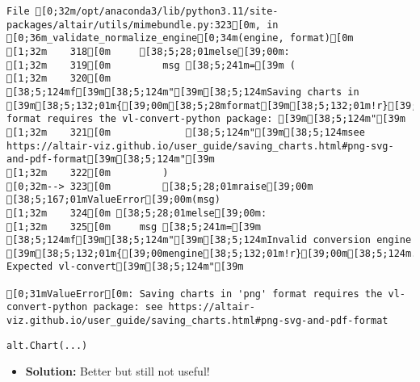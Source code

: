 \documentclass[
  letterpaper,
  DIV=11,
  numbers=noendperiod]{scrartcl}
\providecommand{\tightlist}{%
  \setlength{\itemsep}{0pt}\setlength{\parskip}{0pt}}\usepackage{longtable,booktabs,array}
\begin{document}
\begin{verbatim}
File [0;32m/opt/anaconda3/lib/python3.11/site-packages/altair/utils/mimebundle.py:323[0m, in [0;36m_validate_normalize_engine[0;34m(engine, format)[0m
[1;32m    318[0m     [38;5;28;01melse[39;00m:
[1;32m    319[0m         msg [38;5;241m=[39m (
[1;32m    320[0m             [38;5;124mf[39m[38;5;124m"[39m[38;5;124mSaving charts in [39m[38;5;132;01m{[39;00m[38;5;28mformat[39m[38;5;132;01m!r}[39;00m[38;5;124m format requires the vl-convert-python package: [39m[38;5;124m"[39m
[1;32m    321[0m             [38;5;124m"[39m[38;5;124msee https://altair-viz.github.io/user_guide/saving_charts.html#png-svg-and-pdf-format[39m[38;5;124m"[39m
[1;32m    322[0m         )
[0;32m--> 323[0m         [38;5;28;01mraise[39;00m [38;5;167;01mValueError[39;00m(msg)
[1;32m    324[0m [38;5;28;01melse[39;00m:
[1;32m    325[0m     msg [38;5;241m=[39m [38;5;124mf[39m[38;5;124m"[39m[38;5;124mInvalid conversion engine [39m[38;5;132;01m{[39;00mengine[38;5;132;01m!r}[39;00m[38;5;124m. Expected vl-convert[39m[38;5;124m"[39m

[0;31mValueError[0m: Saving charts in 'png' format requires the vl-convert-python package: see https://altair-viz.github.io/user_guide/saving_charts.html#png-svg-and-pdf-format
\end{verbatim}

\begin{verbatim}
alt.Chart(...)
\end{verbatim}

\begin{itemize}
\tightlist
\item
  \textbf{Solution:} Better but still not useful!
\end{itemize}
\end{document}
